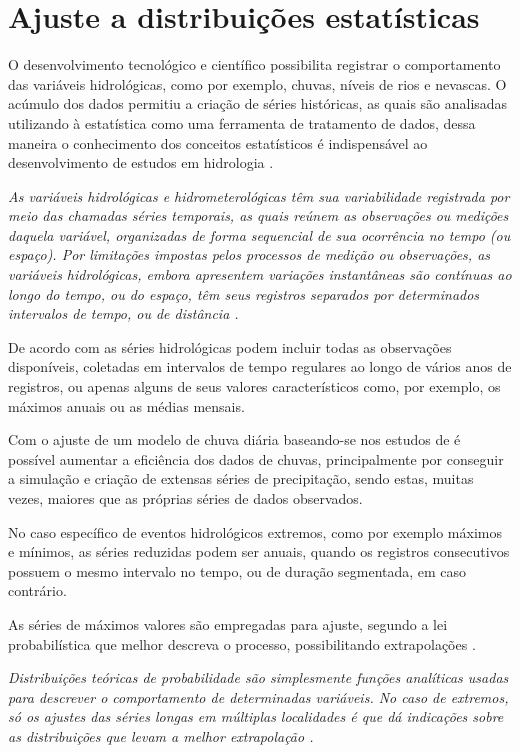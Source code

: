 \section{Ajuste a distribuições estatísticas}

O desenvolvimento tecnológico e científico possibilita registrar o comportamento das variáveis hidrológicas, como por exemplo, chuvas, níveis de rios e nevascas. O acúmulo dos dados permitiu a criação de séries históricas, as quais são analisadas utilizando à estatística como uma ferramenta de tratamento de dados, dessa maneira o conhecimento dos conceitos estatísticos é indispensável ao desenvolvimento de estudos em hidrologia \cite{hidrologia-estatistica}.

\textit{As variáveis hidrológicas e hidrometerológicas têm sua variabilidade registrada por meio das chamadas séries temporais, as quais reúnem as observações ou medições daquela variável, organizadas de forma sequencial de sua ocorrência no tempo (ou espaço). Por limitações impostas pelos processos de medição ou observações, as variáveis hidrológicas, embora apresentem variações instantâneas são contínuas ao longo do tempo, ou do espaço, têm seus registros separados por determinados intervalos de tempo, ou de distância \cite{hidrologia-estatistica-np}.}

De acordo com  as séries hidrológicas podem incluir todas as observações disponíveis, coletadas em intervalos de tempo regulares ao longo de vários anos de registros, ou apenas alguns de seus valores característicos como, por exemplo, os máximos anuais ou as médias mensais. 

Com o ajuste de um modelo de chuva diária baseando-se nos estudos de  é possível aumentar a eficiência dos dados de chuvas, principalmente por conseguir a simulação e criação de extensas séries de precipitação, sendo estas, muitas vezes, maiores que as próprias séries de dados observados.

No caso específico de eventos hidrológicos extremos, como por exemplo máximos e mínimos, as séries reduzidas podem ser anuais, quando os registros consecutivos possuem o mesmo intervalo no tempo, ou de duração segmentada, em caso contrário.

As séries de máximos valores são empregadas para ajuste, segundo a lei probabilística que melhor descreva o processo, possibilitando extrapolações \cite{spchuva}.

\textit{Distribuições teóricas de probabilidade são simplesmente funções analíticas usadas para descrever o comportamento de determinadas variáveis. No caso de extremos, só os ajustes das séries longas em múltiplas localidades é que dá indicações sobre as distribuições que levam a melhor extrapolação \cite{piracicaba}.}

